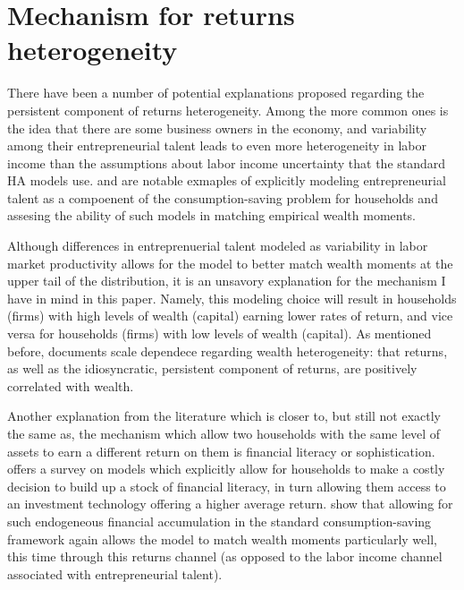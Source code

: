 \onlyinsubfile{\setcounter{section}{2}}
\section{Mechanism for returns heterogeneity}
\notinsubfile{\label{sec:Mechanism}}

\par There have been a number of potential explanations proposed regarding the persistent component of returns heterogeneity. Among the more common ones is the idea that there are some business owners in the economy, and variability among their entrepreneurial talent leads to even more heterogeneity in labor income than the assumptions about labor income uncertainty that the standard HA models use. \cite{Cagetti2006} and \cite{Cagetti2009} are notable exmaples of explicitly modeling entrepreneurial talent as a compoenent of the consumption-saving problem for households and assesing the ability of such models in matching empirical wealth moments.

\par Although differences in entreprenuerial talent modeled as variability in labor market productivity allows for the model to better match wealth moments at the upper tail of the distribution, it is an unsavory explanation for the mechanism I have in mind in this paper. Namely, this modeling choice will result in households (firms) with high levels of wealth (capital) earning lower rates of return, and vice versa for households (firms) with low levels of wealth (capital). As mentioned before, \cite{aflgdmlp20} documents scale dependece regarding wealth heterogeneity: that returns, as well as the idiosyncratic, persistent component of returns, are positively correlated with wealth.

\par Another  explanation from the literature which is closer to, but still not exactly the same as, the mechanism which allow two households with the same level of assets to earn a different return on them is financial literacy or sophistication. \cite{Lusardi2014} offers a survey on models which explicitly allow for households to make a costly decision to build up a stock of financial literacy, in turn allowing them access to an investment technology offering a higher average return. \cite{Lusardi2017} show that allowing for such endogeneous financial accumulation in the standard consumption-saving framework again allows the model to match wealth moments particularly well, this time through this returns channel (as opposed to the labor income channel associated with entrepreneurial talent).


